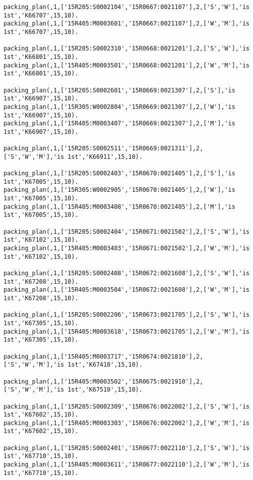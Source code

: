 \documentclass[11pt]{article}
\begin{document}
\begin{verbatim}
packing_plan(,1,['15R205:S0002104','15R0667:0021107'],2,['S','W'],'is 1st','K66707',15,10).
packing_plan(,1,['15R405:M0003601','15R0667:0021107'],2,['W','M'],'is 1st','K66707',15,10).

packing_plan(,1,['15R205:S0002310','15R0668:0021201'],2,['S','W'],'is 1st','K66801',15,10).
packing_plan(,1,['15R405:M0003501','15R0668:0021201'],2,['W','M'],'is 1st','K66801',15,10).

packing_plan(,1,['15R205:S0002601','15R0669:0021307'],2,['S'],'is 1st','K66907',15,10).
packing_plan(,1,['15R305:W0002804','15R0669:0021307'],2,['W'],'is 1st','K66907',15,10).
packing_plan(,1,['15R405:M0003407','15R0669:0021307'],2,['M'],'is 1st','K66907',15,10).

packing_plan(,1,['15R205:S0002511','15R0669:0021311'],2,['S','W','M'],'is 1st','K66911',15,10).

packing_plan(,1,['15R205:S0002403','15R0670:0021405'],2,['S'],'is 1st','K67005',15,10).
packing_plan(,1,['15R305:W0002905','15R0670:0021405'],2,['W'],'is 1st','K67005',15,10).
packing_plan(,1,['15R405:M0003408','15R0670:0021405'],2,['M'],'is 1st','K67005',15,10).

packing_plan(,1,['15R205:S0002404','15R0671:0021502'],2,['S','W'],'is 1st','K67102',15,10).
packing_plan(,1,['15R405:M0003403','15R0671:0021502'],2,['W','M'],'is 1st','K67102',15,10).

packing_plan(,1,['15R205:S0002408','15R0672:0021608'],2,['S','W'],'is 1st','K67208',15,10).
packing_plan(,1,['15R405:M0003504','15R0672:0021608'],2,['W','M'],'is 1st','K67208',15,10).

packing_plan(,1,['15R205:S0002206','15R0673:0021705'],2,['S','W'],'is 1st','K67305',15,10).
packing_plan(,1,['15R405:M0003618','15R0673:0021705'],2,['W','M'],'is 1st','K67305',15,10).

packing_plan(,1,['15R405:M0003717','15R0674:0021810'],2,['S','W','M'],'is 1st','K67410',15,10).

packing_plan(,1,['15R405:M0003502','15R0675:0021910'],2,['S','W','M'],'is 1st','K67510',15,10).

packing_plan(,1,['15R205:S0002309','15R0676:0022002'],2,['S','W'],'is 1st','K67602',15,10).
packing_plan(,1,['15R405:M0003303','15R0676:0022002'],2,['W','M'],'is 1st','K67602',15,10).

packing_plan(,1,['15R205:S0002401','15R0677:0022110'],2,['S','W'],'is 1st','K67710',15,10).
packing_plan(,1,['15R405:M0003611','15R0677:0022110'],2,['W','M'],'is 1st','K67710',15,10).


\end{verbatim}
\end{document}
